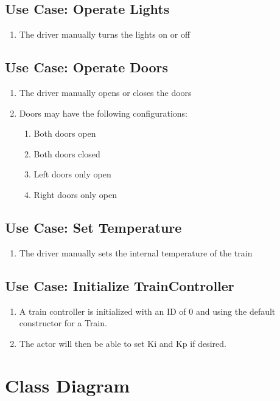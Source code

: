 \documentclass{scrreprt}
\begin{document}
\subsection{Use Case: Operate Lights}
\begin{enumerate}
	\item The driver manually turns the lights on or off
\end{enumerate}

\subsection{Use Case: Operate Doors}
\begin{enumerate}
	\item The driver manually opens or closes the doors
	\item Doors may have the following configurations:
		\begin{enumerate}
			\item Both doors open
			\item Both doors closed
			\item Left doors only open
			\item Right doors only open
		\end{enumerate}
\end{enumerate}

\subsection{Use Case: Set Temperature}
\begin{enumerate}
	\item The driver manually sets the internal temperature of the train
\end{enumerate}

\subsection{Use Case: Initialize TrainController}
\begin{enumerate}
	\item A train controller is initialized with an ID of 0 and using the default constructor for a Train.
	\item The actor will then be able to set Ki and Kp if desired.
\end{enumerate}


\section{Class Diagram}
\end{document}
